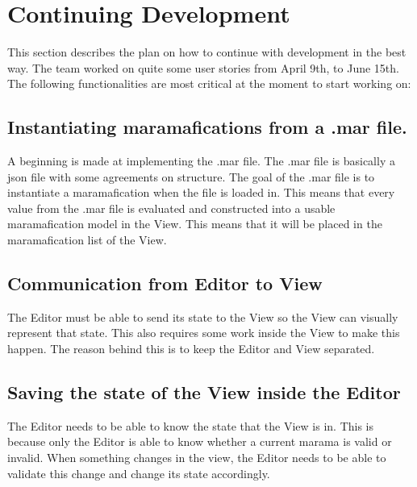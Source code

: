 \documentclass[10pt]{extarticle} %
\begin{document}
    \section{Continuing Development}
    This section describes the plan on how to continue with development in the best way.
    The team worked on quite some user stories from April 9th, to June 15th.
    The following functionalities are most critical at the moment to start working on:
    \subsection{Instantiating maramafications from a .mar file.}
    A beginning is made at implementing the .mar file.
    The .mar file is basically a json file with some agreements on structure.
    The goal of the .mar file is to instantiate a maramafication when the file is loaded in.
    This means that every value from the .mar file is evaluated and constructed into a usable maramafication model in the View.
    This means that it will be placed in the maramafication list of the View.
    \subsection{Communication from Editor to View}
    The Editor must be able to send its state to the View so the View can visually represent that state.
    This also requires some work inside the View to make this happen.
    The reason behind this is to keep the Editor and View separated.
    \subsection{Saving the state of the View inside the Editor}
    The Editor needs to be able to know the state that the View is in.
    This is because only the Editor is able to know whether a current marama is valid or invalid.
    When something changes in the view, the Editor needs to be able to validate this change and change its state accordingly.

    \newpage
    
    
\end{document}
